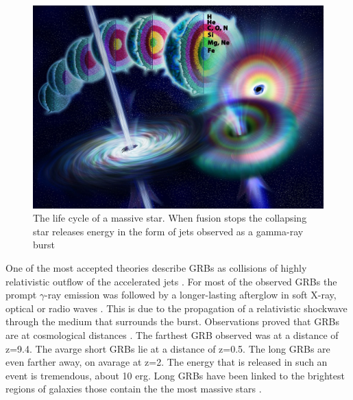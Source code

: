 \documentclass[12pt, a4paper,titlepage]{article}
\numberwithin{equation}{section}
\numberwithin{figure}{section}
\begin{document}
\begin{figure}[H]
\centering
\includegraphics[width=130.0mm]{images/Gamma_ray_burst.jpg}
\caption{The life cycle of a massive star. When fusion stops the collapsing star releases energy in the form of jets observed as a gamma-ray burst}
\end{figure}

One of the most accepted theories describe GRBs as collisions of highly relativistic outflow of the accelerated jets \cite{grb10}. For most of the observed GRBs the prompt $\gamma$-ray emission was followed by a longer-lasting afterglow in soft X-ray, optical or radio waves \cite{grb11}. This is due to the propagation of a relativistic shockwave through the medium that surrounds the burst. Observations proved that GRBs are at cosmological distances \cite{grb12}. The farthest GRB observed was at a distance of z=9.4. The avarge short GRBs lie at a distance of z=0.5. The long GRBs are even farther away, on avarage at z=2. The energy that is released in such an event is tremendous, about 10 erg. Long GRBs have been linked to the brightest regions of galaxies those contain the the most massive stars \cite{grb14}. %
\end{document}
